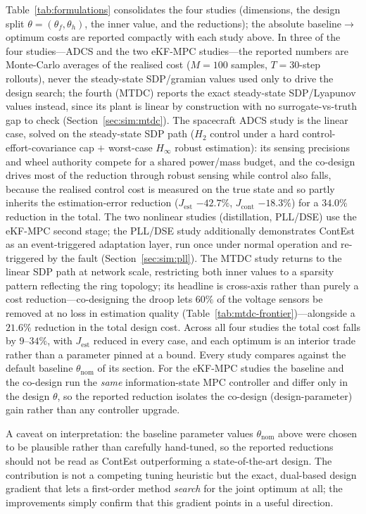 \documentclass[twocolumn,amsthm]{autart}
\begin{document}
Table~\ref{tab:formulations} consolidates the four studies (dimensions, the design
split $\theta=(\theta_f,\theta_h)$, the inner value, and
the reductions); the absolute baseline$\to$optimum costs are reported compactly with
each study above. In three of the four studies---ADCS and the two eKF-MPC
studies---the reported
numbers are Monte-Carlo averages of the realised cost ($M=100$ samples, $T=30$-step
rollouts), never the steady-state SDP/gramian values used only to drive the design
search; the fourth (MTDC) reports the exact steady-state SDP/Lyapunov values instead,
since its plant is linear by construction with no surrogate-vs-truth gap to check
(Section~\ref{sec:sim:mtdc}). The spacecraft ADCS study is the linear case, solved on
the steady-state SDP path ($H_2$ control under a hard control-effort-covariance cap
$+$ worst-case $H_\infty$ robust estimation): its sensing precisions and wheel
authority compete for a shared power/mass budget, and the co-design drives most of
the reduction through robust sensing while control also falls, because the
realised control cost is measured on the true state and so partly inherits the
estimation-error reduction ($J_{\mathrm{est}}$ $-42.7\%$, $J_{\mathrm{cont}}$
$-18.3\%$) for a $34.0\%$ reduction in the total. The two
nonlinear studies (distillation, PLL/DSE) use the eKF-MPC second stage; the PLL/DSE
study additionally demonstrates ContEst as an event-triggered adaptation layer, run
once under normal operation and re-triggered by the fault (Section~\ref{sec:sim:pll}).
The MTDC study
returns to the linear SDP path at network scale, restricting both inner values to a
sparsity pattern reflecting the ring topology; its headline is cross-axis rather than
purely a cost reduction---co-designing the droop lets $60\%$ of the voltage sensors be
removed at no loss in estimation quality (Table~\ref{tab:mtdc-frontier})---alongside a
$21.6\%$ reduction in the total design cost. Across all
four studies the total cost falls by $9$--$34\%$, with $J_{\mathrm{est}}$ reduced in
every case, and each optimum is an interior trade rather than a parameter pinned at a
bound.
Every study compares against the default baseline $\theta_{\mathrm{nom}}$ of its
section. For the eKF-MPC studies the baseline and the co-design run the \emph{same}
information-state MPC controller and differ only in the design $\theta$, so the
reported reduction isolates the co-design (design-parameter) gain rather than any
controller upgrade.

A caveat on interpretation: the baseline parameter values $\theta_{\mathrm{nom}}$
above were chosen to be plausible rather than carefully hand-tuned, so the
reported reductions should not be read as ContEst outperforming a state-of-the-art
design. The contribution is not a competing tuning heuristic but the exact,
dual-based design gradient that lets a first-order method \emph{search} for the
joint optimum at all; the improvements simply confirm that this gradient points
in a useful direction.
\end{document}
